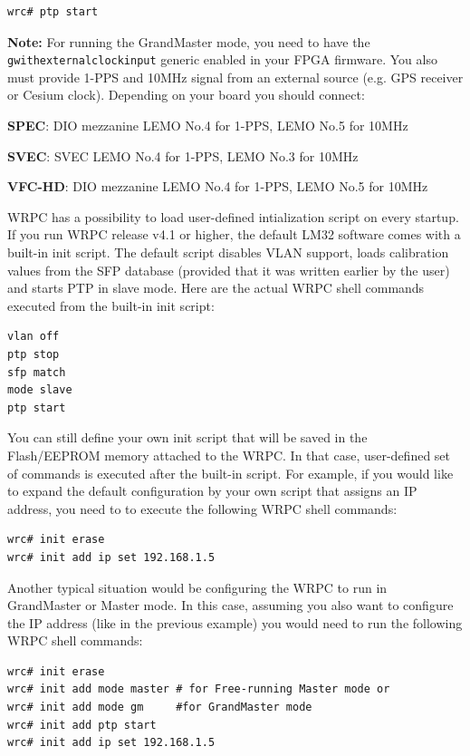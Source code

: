 \documentclass[a4paper, 12pt]{article}
\renewcommand{\_}{\underscore\allowbreak}
\begin{document}
\begin{lstlisting}
wrc# ptp start
\end{lstlisting}

\noindent\textbf{Note:} For running the GrandMaster mode, you need to have the
\texttt{g\_with\_external\_clock\_input} generic enabled in your FPGA firmware.
You also must provide 1-PPS and 10MHz signal from an external source (e.g. GPS receiver or
Cesium clock). Depending on your board you should connect:
\begin{itemize*}
  \item \textbf{SPEC}: DIO mezzanine LEMO No.4 for 1-PPS, LEMO No.5 for 10MHz
  \item \textbf{SVEC}: SVEC LEMO No.4 for 1-PPS, LEMO No.3 for 10MHz
  \item \textbf{VFC-HD}: DIO mezzanine LEMO No.4 for 1-PPS, LEMO No.5 for 10MHz
\end{itemize*}

\vspace{1em}
WRPC has a possibility to load user-defined intialization script on every
startup. If you run WRPC release v4.1 or higher, the default LM32 software
comes with a built-in init script. The default script disables VLAN support,
loads calibration values from the SFP database (provided that it was written
earlier by the user) and starts PTP in slave mode. Here are the actual WRPC
shell commands executed from the built-in init script:
\begin{lstlisting}
vlan off
ptp stop
sfp match
mode slave
ptp start
\end{lstlisting}

You can still define your own init script that will be saved in the
Flash/EEPROM memory attached to the WRPC. In that case, user-defined set of
commands is executed after the built-in script. For example, if you would
like to expand the default configuration by your own script that assigns an IP
address, you need to to execute the following WRPC shell commands:
\begin{lstlisting}
wrc# init erase
wrc# init add ip set 192.168.1.5
\end{lstlisting}

Another typical situation would be configuring the WRPC to run in GrandMaster or
Master mode. In this case, assuming you also want to configure the IP address
(like in the previous example) you would need to run the following WRPC shell
commands:
\begin{lstlisting}
wrc# init erase
wrc# init add mode master # for Free-running Master mode or
wrc# init add mode gm     #for GrandMaster mode
wrc# init add ptp start
wrc# init add ip set 192.168.1.5
\end{lstlisting}
\end{document}
